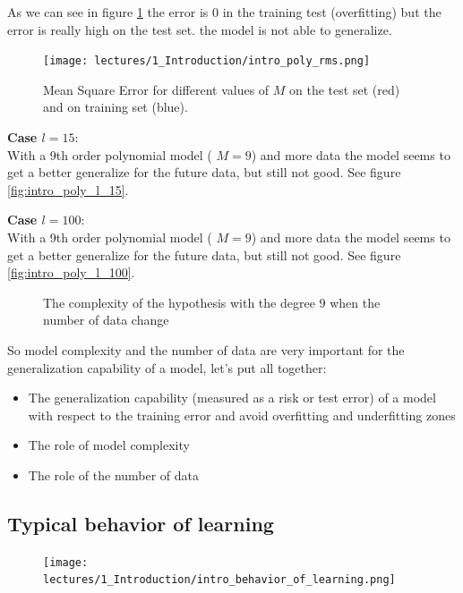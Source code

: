 \documentclass[../main.tex]{subfiles}
\begin{document}
As we can see in figure \ref{fig:intro_poly_rms} the error is 0 in the training test (overfitting) but the error is really high on the test set. the model is not able to generalize.\\
\begin{figure}[ht]
    \centering
    \texttt{[image: lectures/1\_Introduction/intro\_poly\_rms.png]}
    \caption{Mean Square Error for different values of $M$ on the test set (red) and on training set (blue).}
    \label{fig:intro_poly_rms}
\end{figure}


\noindent \textbf{Case $l = 15$}:\\
With a 9th order polynomial model ( $M = 9$) and more data the model seems to get a better generalize for the future data, but still not good. See figure \ref{fig:intro_poly_l_15}.

\noindent \textbf{Case $l = 100$}:\\
With a 9th order polynomial model ( $M = 9$) and more data the model seems to get a better generalize for the future data, but still not good. See figure \ref{fig:intro_poly_l_100}.

\begin{figure}[ht]
  \centering
  \hfill
  \caption{The complexity of the hypothesis with the degree 9 when the number of data change}
\end{figure}

\noindent So model complexity and the number of data are very important for the generalization capability of a model, let's put all together:
\begin{itemize}
    \item The generalization capability (measured as a risk or test error) of a model with respect to the training error and avoid overfitting and underfitting zones
    \item The role of model complexity
    \item The role of the number of data
\end{itemize}

\subsection*{Typical behavior of learning}
\begin{figure}[ht]
    \centering
    \texttt{[image: lectures/1\_Introduction/intro\_behavior\_of\_learning.png]}
\end{figure}
\end{document}
